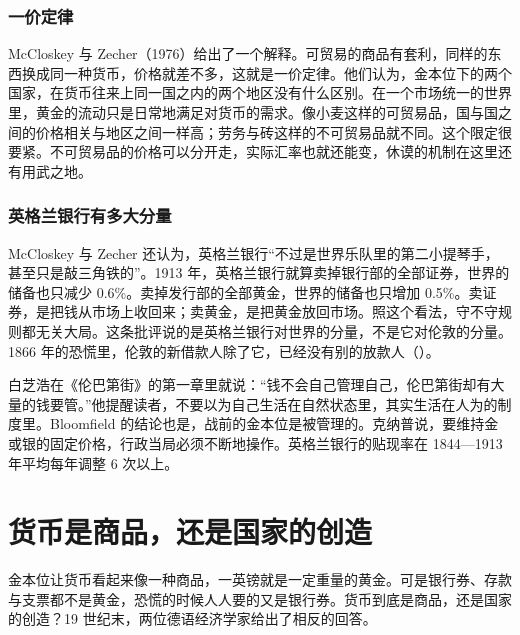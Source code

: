 \subsubsection{一价定律}
McCloskey 与 Zecher（1976）给出了一个解释。可贸易的商品有套利，同样的东西换成同一种货币，价格就差不多，这就是一价定律\cite{bordo1984}。他们认为，金本位下的两个国家，在货币往来上同一国之内的两个地区没有什么区别\cite{bordo1984}。在一个市场统一的世界里，黄金的流动只是日常地满足对货币的需求\cite{bordo1984}。像小麦这样的可贸易品，国与国之间的价格相关与地区之间一样高；劳务与砖这样的不可贸易品就不同\cite{bordo1984}。这个限定很要紧。不可贸易品的价格可以分开走，实际汇率也就还能变，休谟的机制在这里还有用武之地。

\subsubsection{英格兰银行有多大分量}
McCloskey 与 Zecher 还认为，英格兰银行“不过是世界乐队里的第二小提琴手，甚至只是敲三角铁的”\cite{bordo1984}。1913 年，英格兰银行就算卖掉银行部的全部证券，世界的储备也只减少 0.6\%。卖掉发行部的全部黄金，世界的储备也只增加 0.5\%\cite{bordo1984}。卖证券，是把钱从市场上收回来；卖黄金，是把黄金放回市场。照这个看法，守不守规则都无关大局。这条批评说的是英格兰银行对世界的分量，不是它对伦敦的分量。1866 年的恐慌里，伦敦的新借款人除了它，已经没有别的放款人（）。

\begin{pitfall}[金本位会自己运转]
白芝浩在《伦巴第街》的第一章里就说：“钱不会自己管理自己，伦巴第街却有大量的钱要管。”\cite{bagehot1873}他提醒读者，不要以为自己生活在自然状态里，其实生活在人为的制度里\cite{bagehot1873}。Bloomfield 的结论也是，战前的金本位是被管理的\cite{bordo1984}。克纳普说，要维持金或银的固定价格，行政当局必须不断地操作\cite{knapp1924}。英格兰银行的贴现率在 1844—1913 年平均每年调整 6 次以上\cite{boe2017}。
\end{pitfall}

\section{货币是商品，还是国家的创造}\label{sec:gold-state}

金本位让货币看起来像一种商品，一英镑就是一定重量的黄金。可是银行券、存款与支票都不是黄金，恐慌的时候人人要的又是银行券。货币到底是商品，还是国家的创造？19 世纪末，两位德语经济学家给出了相反的回答。


